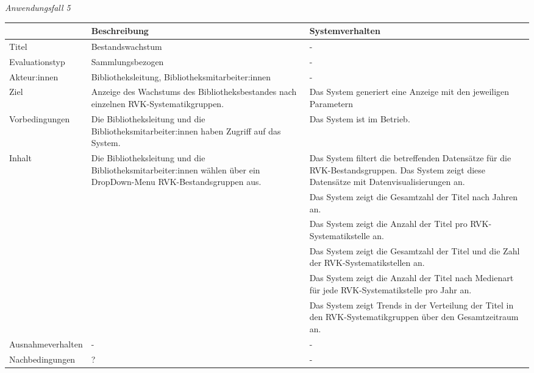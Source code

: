 \newpage
\noindent
\textit{Anwendungsfall 5}

\begingroup
\setlength{\tabcolsep}{10pt} %
\renewcommand{\arraystretch}{1.25} 
\begin{table}[h]
    \centering
    \begin{adjustbox}{max width=\textwidth}
    \begin{tabular}{lp{7.0cm}p{7.0cm}}
       \toprule
       \textbf{}          & \textbf{Beschreibung} &\textbf{Systemverhalten}\\
       \midrule
        Titel                            &Bestandswachstum& -\\
        Evaluationstyp                   &Sammlungsbezogen                   & -\\
        Akteur:innen                     &Bibliotheksleitung, Bibliotheksmitarbeiter:innen& -\\
        Ziel                             &Anzeige des Wachstums des Bibliotheksbestandes nach einzelnen RVK-Systematikgruppen.& Das System generiert eine Anzeige mit den jeweiligen Parametern\\
        Vorbedingungen                   &Die Bibliotheksleitung und die Bibliotheksmitarbeiter:innen haben Zugriff auf das System.& Das System ist im Betrieb.\\
        Inhalt                &Die Bibliotheksleitung und die Bibliotheksmitarbeiter:innen wählen über ein DropDown-Menu RVK-Bestandsgruppen aus.& Das System filtert die betreffenden Datensätze für die RVK-Bestandsgruppen. Das System zeigt diese Datensätze mit Datenvisualisierungen an.\\
                                         & &Das System zeigt die Gesamtzahl der Titel nach Jahren an.\\
                                         & &Das System zeigt die Anzahl der Titel pro RVK-Systematikstelle an.\\
                                         & &Das System zeigt die Gesamtzahl der Titel und die Zahl der RVK-Systematikstellen an.\\
                                         & &Das System zeigt die Anzahl der Titel nach Medienart für jede RVK-Systematikstelle pro Jahr an.\\
                                         & &Das System zeigt Trends in der Verteilung der Titel in den RVK-Systematikgruppen über den Gesamtzeitraum an.\\
        Ausnahmeverhalten               &- & -\\
        Nachbedingungen                 &?& -\\


\end{tabular}
\end{adjustbox}
\end{table}
